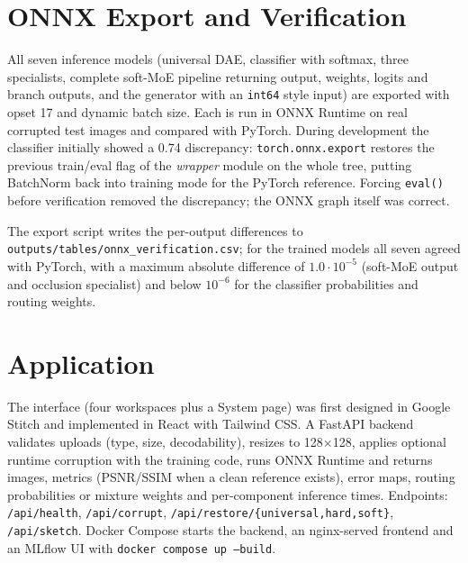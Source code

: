 \documentclass[conference]{IEEEtran}
\begin{document}
\section{ONNX Export and Verification}
All seven inference models (universal DAE, classifier with softmax, three specialists, complete soft-MoE pipeline returning output, weights, logits and branch outputs, and the generator with an \texttt{int64} style input) are exported with opset 17 and dynamic batch size. Each is run in ONNX Runtime on real corrupted test images and compared with PyTorch. During development the classifier initially showed a 0.74 discrepancy: \texttt{torch.onnx.export} restores the previous train/eval flag of the \emph{wrapper} module on the whole tree, putting BatchNorm back into training mode for the PyTorch reference. Forcing \texttt{eval()} before verification removed the discrepancy; the ONNX graph itself was correct.

The export script writes the per-output differences to \texttt{outputs/tables/onnx\_verification.csv}; for the trained models all seven agreed with PyTorch, with a maximum absolute difference of $1.0\cdot10^{-5}$ (soft-MoE output and occlusion specialist) and below $10^{-6}$ for the classifier probabilities and routing weights.

\section{Application}
The interface (four workspaces plus a System page) was first designed in Google Stitch and implemented in React with Tailwind CSS. A FastAPI backend validates uploads (type, size, decodability), resizes to 128$\times$128, applies optional runtime corruption with the training code, runs ONNX Runtime and returns images, metrics (PSNR/SSIM when a clean reference exists), error maps, routing probabilities or mixture weights and per-component inference times. Endpoints: \texttt{/api/health}, \texttt{/api/corrupt}, \texttt{/api/restore/\{universal,hard,soft\}}, \texttt{/api/sketch}. Docker Compose starts the backend, an nginx-served frontend and an MLflow UI with \texttt{docker compose up --build}.

\end{document}
